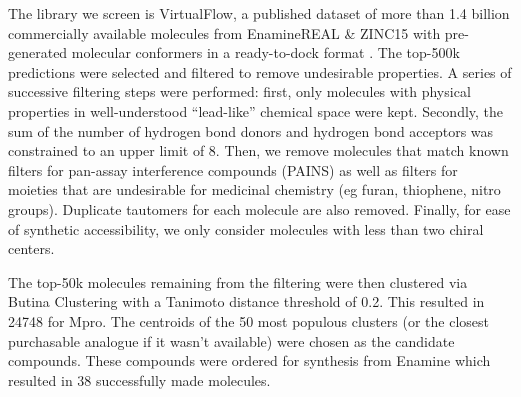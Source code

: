 The library we screen is VirtualFlow, a published dataset of more than 1.4 billion commercially available molecules from EnamineREAL \& ZINC15 with pre-generated molecular conformers in a ready-to-dock format \cite{Gorgulla2020VirtualFlow}. The top-500k predictions were selected and filtered to remove undesirable properties. A series of successive filtering steps were performed: first, only molecules with physical properties in well-understood ``lead-like'' chemical space \cite{ChemSpace} were kept. Secondly, the sum of the number of hydrogen bond donors and hydrogen bond acceptors was constrained to an upper limit of 8. Then, we remove molecules that match known filters for pan-assay interference compounds (PAINS) \cite{Baell2010Pains} as well as filters for moieties that are undesirable for medicinal chemistry (eg furan, thiophene, nitro groups). Duplicate tautomers for each molecule are also removed. Finally, for ease of synthetic accessibility, we only consider molecules with less than two chiral centers.

The top-50k molecules remaining from the filtering were then clustered via Butina Clustering \cite{Butina1999Clustering} with a Tanimoto distance threshold of 0.2. This resulted in 24748 for Mpro. The centroids of the 50 most populous clusters (or the closest purchasable analogue if it wasn't available) were chosen as the candidate compounds. These compounds were ordered for synthesis from Enamine which resulted in 38 successfully made molecules.


